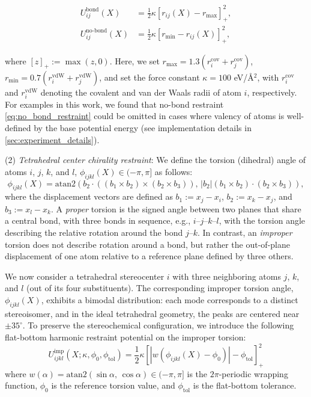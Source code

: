\documentclass[]{fairmeta}
\theoremstyle{remark}
\begin{document}
\begin{align}
U_{ij}^\text{bond}(X) &= \frac{1}{2} \kappa[r_{ij}(X) - r_\text{max}]_+^2,
\label{eq:bond_restraint} \\
U_{ij}^\text{no-bond}(X) &= \frac{1}{2} \kappa[r_\text{min} - r_{ij}(X)]_+^2,
\label{eq:no_bond_restraint}
\end{align}

where $[z]_+ := \max(z, 0)$.
Here, we set $r_\text{max} = 1.3(r_i^\text{cov} + r_j^\text{cov})$, $r_\text{min} = 0.7(r_i^\text{vdW} + r_j^\text{vdW})$, and set the force constant $\kappa = 100$ eV/\AA{}$^2$, with $r_i^\text{cov}$ and $r_i^\text{vdW}$ denoting the covalent and van der Waals radii of atom $i$, respectively.
For examples in this work, we found that no-bond restraint \cref{eq:no_bond_restraint} could be omitted in cases where valency of atoms is well-defined by the base potential energy (see implementation details in \cref{sec:experiment_details}).

(2) \textit{Tetrahedral center chirality restraint}:
We define the torsion (dihedral) angle of atoms $i$, $j$, $k$, and $l$, $\phi_{ijkl}(X) \in (-\pi, \pi]$ as follows:
\begin{equation}
\phi_{ijkl}(X) = \mathrm{atan2}\left(b_2 \cdot ((b_1 \times b_2) \times (b_2 \times b_3)), \, |b_2| (b_1 \times b_2) \cdot (b_2 \times b_3)\right),
\label{eq:torsion}
\end{equation}
where the displacement vectors are defined as $b_1 := x_j - x_i$, $b_2 := x_k - x_j$, and $b_3 := x_l - x_k$.
A \textit{proper} torsion is the signed angle between two planes that share a central bond, with three bonds in sequence, e.g., $i$--$j$--$k$--$l$, with the torsion angle describing the relative rotation around the bond $j$--$k$.
In contrast, an \textit{improper} torsion does not describe rotation around a bond, but rather the out-of-plane displacement of one atom relative to a reference plane defined by three others.

We now consider a tetrahedral stereocenter $i$ with three neighboring atoms $j$, $k$, and $l$ (out of its four substituents).
The corresponding improper torsion angle, $\phi_{ijkl}(X)$, exhibits a bimodal distribution: each mode corresponds to a distinct stereoisomer, and in the ideal tetrahedral geometry, the peaks are centered near $\pm35^\circ$.
To preserve the stereochemical configuration, we introduce the following flat-bottom harmonic restraint potential on the improper torsion:
\begin{equation}
U_{ijkl}^\text{imp}(X; \kappa, \phi_0, \phi_\text{tol}) = \frac{1}{2} \kappa [|w(\phi_{ijkl}(X) - \phi_0)| - \phi_\text{tol}]_+^2
\end{equation}
where $w(\alpha) = \mathrm{atan2}(\sin\alpha, \, \cos\alpha) \in (-\pi, \pi]$ is the $2\pi$-periodic wrapping function, $\phi_0$ is the reference torsion value, and $\phi_\text{tol}$ is the flat-bottom tolerance.
\end{document}
